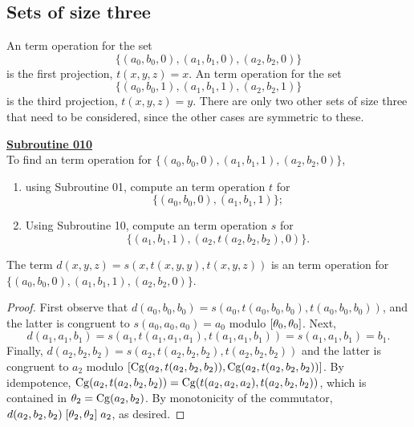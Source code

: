 \smallskip

\subsection{Sets of size three}
An \ld term operation for the set
\begin{equation*}
\{(a_0,b_0, 0), (a_1, b_1, 0), (a_2, b_2, 0)\}
\end{equation*}
is the first projection, $t(x,y,z) = x$.
An \ld term operation for the set
\begin{equation*}
\{(a_0,b_0,1), (a_1, b_1, 1), (a_2, b_2, 1)\}
\end{equation*}
is the third projection, $t(x,y,z) = y$.
There are only two other sets of size three that need to be considered, 
since the other cases are symmetric to these.

\smallskip

\noindent \underline{\textbf{Subroutine 010}}\\[4pt]
To find an \ld term operation for
$\{(a_0, b_0, 0), (a_1, b_1, 1),  (a_2, b_2, 0)\}$,
\begin{enumerate}
\item using Subroutine 01, compute an \ld term operation $t$ for
\begin{equation*}
\{(a_0, b_0, 0), (a_1, b_1, 1)\}; 
\end{equation*}
\item Using Subroutine 10, compute an \ld term operation $s$ for
\begin{equation*}
\{(a_1, b_1, 1), (a_2, t(a_2,b_2,b_2), 0)\}.
\end{equation*}
\end{enumerate}
 The term
$d(x,y,z) = s(x, t(x,y,y), t(x,y,z))$
is an \ld term operation for
$\{(a_0, b_0, 0), (a_1, b_1, 1),  (a_2, b_2, 0)\}$.
\begin{proof}
First observe that
$d(a_0, b_0, b_0)=s(a_0, t(a_0,b_0,b_0), t(a_0,b_0,b_0))$, and the latter is
congruent to $s(a_0, a_0, a_0) = a_0$ modulo $[\theta_0, \theta_0]$.
Next,
\[
d(a_1, a_1, b_1)
=s(a_1, t(a_1,a_1, a_1), t(a_1,a_1,b_1))
=s(a_1, a_1, b_1) = b_1.\]
Finally, $d(a_2, b_2, b_2)=s(a_2, t(a_2,b_2,b_2), t(a_2,b_2,b_2))$
and the latter is congruent to $a_2$ modulo
$\mathrel{[\operatorname{Cg}(a_2, t(a_2,b_2,b_2)), \operatorname{Cg}(a_2, t(a_2,b_2,b_2))]}$.
By idempotence, $\operatorname{Cg}(a_2, t(a_2,b_2,b_2)) =
\operatorname{Cg}(t(a_2,a_2,a_2), t(a_2,b_2,b_2))$, which is contained 
in $\theta_2 = \operatorname{Cg}(a_2, b_2)$.
By monotonicity of the commutator,
$d(a_2, b_2, b_2)\mathrel{[\theta_2, \theta_2]} a_2$, as desired.
\end{proof}
\medskip

